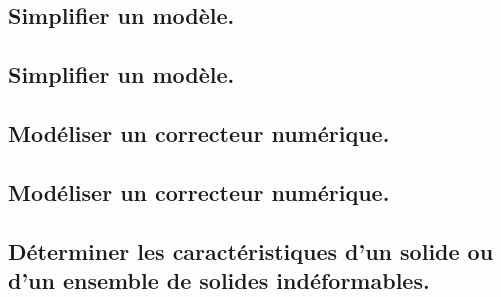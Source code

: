 \documentclass[10pt,fleqn]{book}
\newcommand{\repRel}{../..}
\newcommand{\repStyle}{\repRel/Style}
\newcommand{\td}{fichier_td}
\newcommand{\repExos}{\repRel/ExercicesCompetences}
\newcommand{\repExo}{dossier}
\begin{document}
\renewcommand{\repExo}{\repExos/B2_ProposerModele/B2_07_ModelisationSchemaBlocs/53_BancEpreuveHydraulique}
\renewcommand{\td}{53_BancEpreuveHydraulique}
\graphicspath{{\repStyle/png/}{\repExo/images/}}


\renewcommand{\repExo}{\repExos/B2_ProposerModele/B2_07_ModelisationSchemaBlocs/71_Robovolc}
\renewcommand{\td}{71_Robovolc}
\graphicspath{{\repStyle/png/}{\repExo/images/}}


\renewcommand{\repExo}{\repExos/B2_ProposerModele/B2_07_ModelisationSchemaBlocs/77_ProtheseTibia}
\renewcommand{\td}{77_ProtheseTibia}
\graphicspath{{\repStyle/png/}{\repExo/images/}}


\renewcommand{\repExo}{\repExos/B2_ProposerModele/B2_07_ModelisationSchemaBlocs/78_RobotDaVinci}
\renewcommand{\td}{78_RobotDaVinci}
\graphicspath{{\repStyle/png/}{\repExo/images/}}


\renewcommand{\repExo}{\repExos/B2_ProposerModele/B2_07_ModelisationSchemaBlocs/79_Tuyere}
\renewcommand{\td}{79_Tuyere}
\graphicspath{{\repStyle/png/}{\repExo/images/}}


\renewcommand{\repExo}{\repExos/B2_ProposerModele/B2_07_ModelisationSchemaBlocs/80_Clever}
\renewcommand{\td}{80_Clever}
\graphicspath{{\repStyle/png/}{\repExo/images/}}


\subsection{Simplifier un modèle.} 

\subsection{Simplifier un modèle.} 

\subsection{Modéliser un correcteur numérique. } 

\subsection{Modéliser un correcteur numérique. } 

\subsection{Déterminer les caractéristiques d'un solide ou d'un ensemble de solides indéformables.} 
\end{document}
